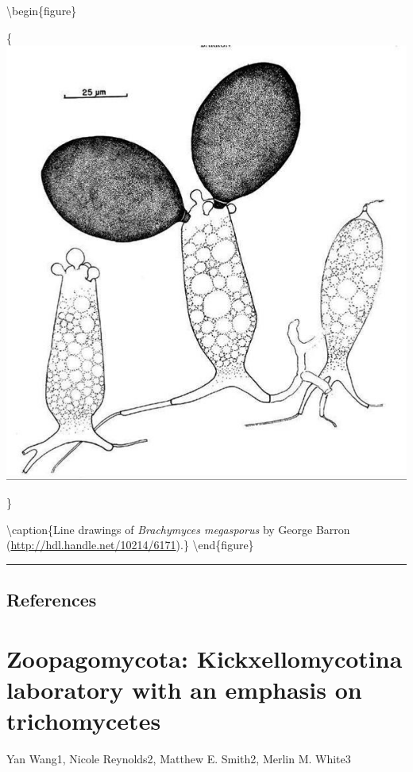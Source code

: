 \documentclass[]{book}
\begin{document}
\textbackslash begin\{figure\}

\{\centering \includegraphics{img/Ch3_Fig9}

\}

\textbackslash caption\{Line drawings of \emph{Brachymyces megasporus} by George Barron (\url{http://hdl.handle.net/10214/6171}).\}\label{fig:ch3fig9}
\textbackslash end\{figure\}

\begin{center}\rule{0.5\linewidth}{\linethickness}\end{center}

\hypertarget{references-1}{%
\section{References}\label{references-1}}

\hypertarget{Kickxellomycotina}{%
\chapter{Zoopagomycota: Kickxellomycotina laboratory with an emphasis on trichomycetes}\label{Kickxellomycotina}}

Yan Wang1, Nicole Reynolds2, Matthew E. Smith2, Merlin M. White3
\end{document}

